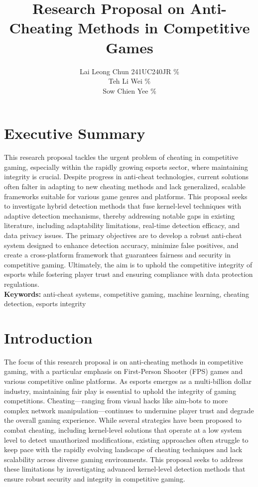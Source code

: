 \documentclass[a4paper, 12pt]{article}
\author{
Lai Leong Chun \quad 241UC240JR \quad 34\% \\
Teh Li Wei \quad 1211109581 \quad 33\%\\
Sow Chien Yee \quad 1211210800 \quad 33\%\\
}
\title{ Research Proposal on Anti-Cheating Methods in Competitive Games  }
\begin{document}
\maketitle

\section*{Executive Summary}
This research proposal tackles the urgent problem of cheating in competitive gaming, especially within the rapidly growing esports sector, where maintaining integrity is crucial. Despite progress in anti-cheat technologies, current solutions often falter in adapting to new cheating methods and lack generalized, scalable frameworks suitable for various game genres and platforms. This proposal seeks to investigate hybrid detection methods that fuse kernel-level techniques with adaptive detection mechanisms, thereby addressing notable gaps in existing literature, including adaptability limitations, real-time detection efficacy, and data privacy issues. The primary objectives are to develop a robust anti-cheat system designed to enhance detection accuracy, minimize false positives, and create a cross-platform framework that guarantees fairness and security in competitive gaming. Ultimately, the aim is to uphold the competitive integrity of esports while fostering player trust and ensuring compliance with data protection regulations.
\hfill
\\
\textbf{Keywords:} anti-cheat systems, competitive gaming, machine learning, cheating detection, esports integrity \\
\newpage
\tableofcontents
\newpage
\section{Introduction}
The focus of this research proposal is on anti-cheating methods in competitive gaming, with a particular emphasis on First-Person Shooter (FPS) games and various competitive online platforms. As esports emerges as a multi-billion dollar industry, maintaining fair play is essential to uphold the integrity of gaming competitions. Cheating—ranging from visual hacks like aim-bots to more complex network manipulation—continues to undermine player trust and degrade the overall gaming experience. While several strategies have been proposed to combat cheating, including kernel-level solutions that operate at a low system level to detect unauthorized modifications, existing approaches often struggle to keep pace with the rapidly evolving landscape of cheating techniques and lack scalability across diverse gaming environments. This proposal seeks to address these limitations by investigating advanced kernel-level detection methods that ensure robust security and integrity in competitive gaming.
\end{document}
